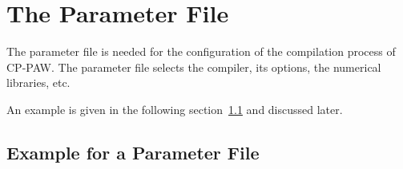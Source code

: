 \documentclass[a4paper,10pt]{report}
\begin{document}
\chapter{The Parameter File}
\label{sec:parmfile}

The parameter file is needed for the configuration of the compilation
process of CP-PAW. The parameter file selects the compiler, its
options, the numerical libraries, etc. 

An example is given in the following
section~\ref{sec:parms.example} and discussed later.

\section{Example for a Parameter File}
\label{sec:parms.example}
\end{document}
